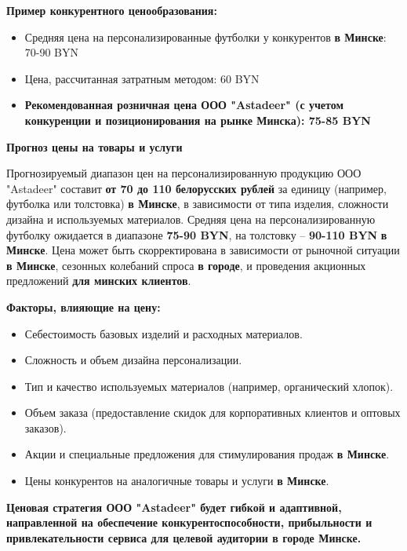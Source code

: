 \textbf{Пример конкурентного ценообразования:}

\begin{itemize}[noitemsep]
\item Средняя цена на персонализированные футболки у конкурентов \textbf{в Минске}: 70-90 BYN
\item Цена, рассчитанная затратным методом: 60 BYN
\item \textbf{Рекомендованная розничная цена ООО "Astadeer" (с учетом конкуренции и позиционирования на рынке Минска): 75-85 BYN}
\end{itemize}

\textbf{Прогноз цены на товары и услуги}

Прогнозируемый диапазон цен на персонализированную продукцию ООО "Astadeer" составит \textbf{от 70 до 110 белорусских рублей} за единицу (например, футболка или толстовка) \textbf{в Минске}, в зависимости от типа изделия, сложности дизайна и используемых материалов.  Средняя цена на персонализированную футболку ожидается в диапазоне \textbf{75-90 BYN}, на толстовку – \textbf{90-110 BYN} \textbf{в Минске}.  Цена может быть скорректирована в зависимости от рыночной ситуации \textbf{в Минске}, сезонных колебаний спроса \textbf{в городе}, и проведения акционных предложений \textbf{для минских клиентов}.

\vspace{0.9cm}

\textbf{Факторы, влияющие на цену:}

\begin{itemize}[noitemsep]
\item Себестоимость базовых изделий и расходных материалов.
\item Сложность и объем дизайна персонализации.
\item Тип и качество используемых материалов (например, органический хлопок).
\item Объем заказа (предоставление скидок для корпоративных клиентов и оптовых заказов).
\item Акции и специальные предложения для стимулирования продаж \textbf{в Минске}.
\item Цены конкурентов на аналогичные товары и услуги \textbf{в Минске}.
\end{itemize}

\vspace{0.3cm}

\textbf{Ценовая стратегия ООО "Astadeer" будет гибкой и адаптивной, направленной на обеспечение конкурентоспособности, прибыльности и привлекательности сервиса для целевой аудитории \textbf{в городе Минске}.}